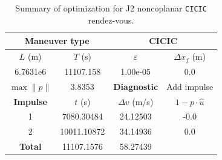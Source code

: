 \begin{table}[htpb]
    \centering
    \begin{tabular}{cccc} \toprule
    \multicolumn{2}{c}{\textbf{Maneuver type}} & \multicolumn{2}{c}{CICIC} \\ \midrule
    \(L\) (m) & \(T\) (s) & \(\varepsilon\) & \(\Delta x_{f}\) (m)    \\ \midrule
    6.7631e6          & 11107.158          & 1.00e-05                & 0.0                        \\ \midrule
    \(\max \lVert p \rVert\) & 3.8353     & \textbf{Diagnostic}   & Add impulse        \\ \midrule
    \textbf{Impulse} & \(t\) (s) & \(\Delta v\) (m/s) & \(1 - p \cdot \hat{u}\) \\ \midrule
    1                 & 7080.30484          & 24.12503             & -0.0                    \\
    2                 & 10011.10872          & 34.14936             & 0.0                    \\\midrule
    \textbf{Total}   & 11107.1576          & 58.27439             &                     \\ \bottomrule   
    \end{tabular}
    \caption{Summary of optimization for J2 noncoplanar \texttt{CICIC} rendez-vous.}
    \label{tab:j2_ncop_CICIC_tab}
\end{table}

